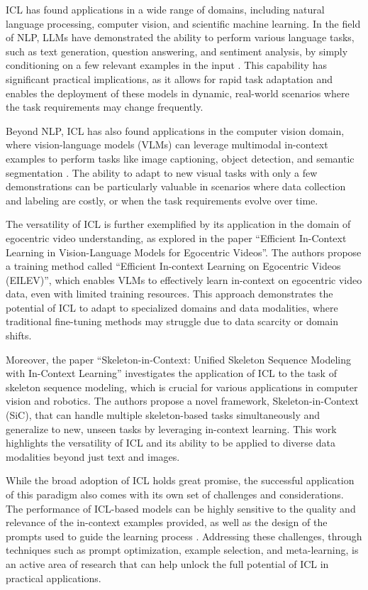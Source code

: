 \documentclass[11pt]{article}
\begin{document}
ICL has found applications in a wide range of domains, including natural language processing, computer vision, and scientific machine learning. In the field of NLP, LLMs have demonstrated the ability to perform various language tasks, such as text generation, question answering, and sentiment analysis, by simply conditioning on a few relevant examples in the input \cite{ref26}. This capability has significant practical implications, as it allows for rapid task adaptation and enables the deployment of these models in dynamic, real-world scenarios where the task requirements may change frequently.

Beyond NLP, ICL has also found applications in the computer vision domain, where vision-language models (VLMs) can leverage multimodal in-context examples to perform tasks like image captioning, object detection, and semantic segmentation \cite{ref27}. The ability to adapt to new visual tasks with only a few demonstrations can be particularly valuable in scenarios where data collection and labeling are costly, or when the task requirements evolve over time.

The versatility of ICL is further exemplified by its application in the domain of egocentric video understanding, as explored in the paper ``Efficient In-Context Learning in Vision-Language Models for Egocentric Videos''. The authors propose a training method called ``Efficient In-context Learning on Egocentric Videos (EILEV)'', which enables VLMs to effectively learn in-context on egocentric video data, even with limited training resources. This approach demonstrates the potential of ICL to adapt to specialized domains and data modalities, where traditional fine-tuning methods may struggle due to data scarcity or domain shifts.

Moreover, the paper ``Skeleton-in-Context: Unified Skeleton Sequence Modeling with In-Context Learning'' investigates the application of ICL to the task of skeleton sequence modeling, which is crucial for various applications in computer vision and robotics. The authors propose a novel framework, Skeleton-in-Context (SiC), that can handle multiple skeleton-based tasks simultaneously and generalize to new, unseen tasks by leveraging in-context learning. This work highlights the versatility of ICL and its ability to be applied to diverse data modalities beyond just text and images.

While the broad adoption of ICL holds great promise, the successful application of this paradigm also comes with its own set of challenges and considerations. The performance of ICL-based models can be highly sensitive to the quality and relevance of the in-context examples provided, as well as the design of the prompts used to guide the learning process \cite{ref28}. Addressing these challenges, through techniques such as prompt optimization, example selection, and meta-learning, is an active area of research that can help unlock the full potential of ICL in practical applications.
\end{document}
